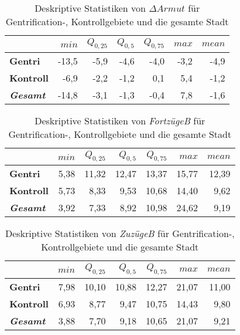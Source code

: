 \begin{table}[H]
\centering
\begin{tabular}{@{}lrrrrrr@{}}
\toprule
               & $min$ & $Q_{0,25}$ & $Q_{0,5}$ & $Q_{0,75}$ & $max$ & $mean$ \\ \midrule
{\bf Gentri}   & -13,5 & -5,9 & -4,6 &  -4,0 & -3,2 & -4,9 \\
{\bf Kontroll} & -6,9  & -2,2 & -1,2 &   0,1 &  5,4 & -1,2 \\ \hdashline 
{\bf \textit{Gesamt}} & -14,8 & -3,1 &  -1,3 & -0,4 &  7,8 & -1,6 \\ \bottomrule
\end{tabular}
\caption[Deskriptive Statistiken von $\Delta Armut$]{Deskriptive Statistiken von $\Delta Armut$ für Gentrification-, Kontrollgebiete und die gesamte Stadt}
\label{tab:Armutchg}
\end{table}

\begin{table}[H]
\centering
\begin{tabular}{@{}lrrrrrr@{}}
\toprule
               & $min$ & $Q_{0,25}$ & $Q_{0,5}$ & $Q_{0,75}$ & $max$ & $mean$ \\ \midrule
{\bf Gentri}   & 5,38 & 11,32 & 12,47 & 13,37 & 15,77 & 12,39 \\
{\bf Kontroll} & 5,73 &  8,33 &  9,53 & 10,68 & 14,40 & 9,62 \\ \hdashline 
{\bf \textit{Gesamt}} & 3,92 & 7,33 & 8,92 & 10,98 & 24,62 & 9,19 \\ \bottomrule
\end{tabular}
\caption[Deskriptive Statistiken von \textit{FortzügeB}]{Deskriptive Statistiken von \textit{FortzügeB} für Gentrification-, Kontrollgebiete und die gesamte Stadt}
\label{tab:FortzuegeR}
\end{table}

\begin{table}[H]
\centering
\begin{tabular}{@{}lrrrrrr@{}}
\toprule
               & $min$ & $Q_{0,25}$ & $Q_{0,5}$ & $Q_{0,75}$ & $max$ & $mean$ \\ \midrule
{\bf Gentri}   & 7,98 & 10,10 & 10,88 & 12,27 & 21,07 & 11,00 \\
{\bf Kontroll} & 6,93 & 8,77 & 9,47 & 10,75 & 14,43 &  9,80  \\ \hdashline 
{\bf \textit{Gesamt}} & 3,88 & 7,70 & 9,18  & 10,65 & 21,07 & 9,21 \\ \bottomrule
\end{tabular}
\caption[Deskriptive Statistiken von \textit{ZuzügeB}]{Deskriptive Statistiken von \textit{ZuzügeB} für Gentrification-, Kontrollgebiete und die gesamte Stadt}
\label{tab:ZuzuegeR}
\end{table}

